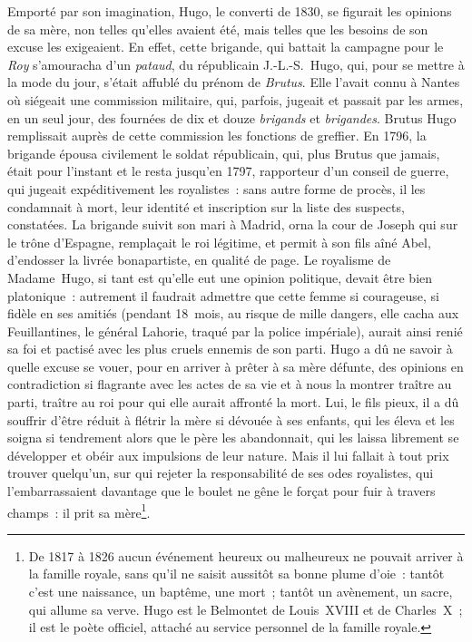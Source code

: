 \documentclass[french,twoside]{book} %
\begin{document}
Emporté par son imagination, Hugo, le converti de 1830, se figurait les opinions de sa mère, non telles qu’elles avaient été, mais telles que les besoins de son excuse les exigeaient. En effet, cette brigande, qui battait la campagne pour le {\itshape Roy} s’amouracha d’un {\itshape pataud}, du républicain J.-L.-S. Hugo, qui, pour se mettre à la mode du jour, s’était affublé du prénom de {\itshape Brutus}. Elle l’avait connu à Nantes où siégeait une commission militaire, qui, parfois, jugeait et passait par les armes, en un seul jour, des fournées de dix et douze {\itshape brigands} et {\itshape brigandes}. Brutus Hugo remplissait auprès de cette commission les fonctions de greffier. En 1796, la brigande épousa civilement le soldat républicain, qui, plus Brutus que jamais, était pour l’instant et le resta jusqu’en 1797,  
\label{p10}rapporteur d’un conseil de guerre, qui jugeait expéditivement les royalistes : sans autre forme de procès, il les condamnait à mort, leur identité et inscription sur la liste des suspects, constatées. La brigande suivit son mari à Madrid, orna la cour de Joseph qui sur le trône d’Espagne, remplaçait le roi légitime, et permit à son fils aîné Abel, d’endosser la livrée bonapartiste, en qualité de page. Le royalisme de Madame Hugo, si tant est qu’elle eut une opinion politique, devait être bien platonique : autrement il faudrait admettre que cette femme si courageuse, si fidèle en ses amitiés (pendant 18 mois, au risque de mille dangers, elle cacha aux Feuillantines, le général Lahorie, traqué par la police impériale), aurait ainsi renié sa foi et pactisé avec les plus cruels ennemis de son parti. Hugo a dû ne savoir à quelle excuse se vouer, pour en arriver à prêter à sa mère défunte, des opinions en contradiction si flagrante avec les actes de sa vie et à nous la montrer traître au parti, traître au roi pour qui elle aurait affronté la mort. Lui, le fils pieux, il a dû souffrir d’être réduit à flétrir la mère si dévouée à ses enfants, qui les éleva et les soigna si tendrement alors que le père les abandonnait, qui les laissa librement se développer et obéir aux impulsions de leur nature. Mais il lui fallait à tout prix trouver quelqu’un, sur qui rejeter la responsabilité de ses odes royalistes, qui l’embarrassaient davantage que le boulet ne gêne le forçat pour fuir à travers champs : il prit sa mère\footnote{De 1817 à 1826 aucun événement heureux ou malheureux ne pouvait arriver à la famille royale, sans qu’il ne saisit aussitôt sa bonne plume d’oie : tantôt c’est une naissance, un baptême, une mort ; tantôt un avènement, un sacre, qui allume sa verve. Hugo est le Belmontet de Louis XVIII et de Charles X ; il est le poète officiel, attaché au service personnel de la famille royale.}.  
\end{document}
